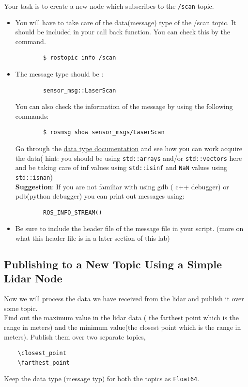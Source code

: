 \documentclass[letta4 paper]{article}
\numberwithin{equation}{section}
\newcommand{\0}{\mathbf{0}}
\begin{document}
	Your task is to create a new node which subscribes to the \texttt{/scan} topic.
	
	\begin{itemize}
		\item You will have to take care of the data(message) type of the /scan topic. It should be included in your call back function. You can check this by the command. 
		\begin{lstlisting}
		$ rostopic info /scan
		\end{lstlisting}{}
		\item The message type should be :
		\begin{lstlisting}
		sensor_msg::LaserScan
		\end{lstlisting}{}
		You can also check the information of the message by using the following commands: \\
		\begin{lstlisting}
		$ rosmsg show sensor_msgs/LaserScan
		\end{lstlisting}{}
		Go through the \href{http://docs.ros.org/melodic/api/sensor_msgs/html/msg/LaserScan.html}{data type documentation} and see how you can work acquire the data( hint: you should be using \texttt{std::arrays} and/or \texttt{std::vectors} here and be taking care of inf values using \texttt{std::isinf} and \texttt{NaN} values using \texttt{std::isnan})\\
		
		\textbf{Suggestion}: If you are not familiar with using gdb ( c++ debugger) or pdb(python debugger) you can print out messages using:
		\begin{lstlisting}
		ROS_INFO_STREAM()
		\end{lstlisting}{}
		
		\item Be sure to include the header file of the message file in your script. (more on what this header file is in a later section of this lab) 
	\end{itemize}{}
	
	\subsection{Publishing to a New Topic Using a Simple Lidar Node}
	
	Now we will process the data we have received from the lidar and publish it over some topic. 
	\\
	Find out the maximum value in the lidar data ( the farthest point which is the range in meters) and the minimum value(the closest point which is the range in meters). Publish them over two separate topics,
	\begin{lstlisting}
	\closest_point
	\farthest_point
	\end{lstlisting}{}
	Keep the data type (message typ) for both the topics as \texttt{Float64}. 
	
\end{document}
